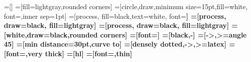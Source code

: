\usepackage{ifthen}
\usepackage{tikz}
\usetikzlibrary{arrows,shapes}


=[]
=[fill=lightgray,rounded corners]
=[circle,draw,minimum size=15pt,fill=white,
font=\footnotesize,inner sep=1pt]
=[process, fill=black,text=white, font=\bfseries]
=[process, draw=black, fill=lightgray]
=[process, draw=black, fill=lightgray]
=[white,draw=black,rounded corners]
=[font=\footnotesize]
=[black,-]%
=[->,>=angle 45]
=[min distance=30pt,curve to]
=[densely dotted,->,>=latex]
=[font=\bfseries,very thick]
=[hl]
=[font=\normalfont,thin]

\newcommand{\currentScope}{}
\newcommand{\currentSort}{}
\newcommand{\currentSortLabel}{}
\newcommand{\currentAlign}{}
\newcommand{\currentSize}{}

\newcommand{\TSetSortLabel}[2]{
  \expandafter\repcommand\expandafter{\csname TUserSort@#1\endcsname}{#2}
}
\newcommand{\TSort}[4]{
  \renewcommand{\currentScope}{#1}
  \renewcommand{\currentSort}{#2}
  \renewcommand{\currentSize}{#3}
  \renewcommand{\currentAlign}{#4}
  \ifcsname TUserSort@\currentSort\endcsname
    \renewcommand{\currentSortLabel}{\csname TUserSort@\currentSort\endcsname}
  \else
    \renewcommand{\currentSortLabel}{\currentSort}
  \fi
  \begin{scope}[shift={\currentScope}]
  \ifthenelse{\equal{\currentAlign}{l}}{
    \filldraw[process box] (-0.5,-0.5) rectangle (0.5,\currentSize-0.5);
    \node[sort] at (-0.2,\currentSize-0.4) {\currentSortLabel};
   }{\ifthenelse{\equal{\currentAlign}{r}}{
     \filldraw[process box] (-0.5,-0.5) rectangle (0.5,\currentSize-0.5);
     \node[sort] at (0.2,\currentSize-0.4) {\currentSortLabel};
   }{
    \filldraw[process box] (-0.5,-0.5) rectangle (\currentSize-0.5,0.5);
    \ifthenelse{\equal{\currentAlign}{t}}{
      \node[sort,anchor=east] at (-0.3,0.2) {\currentSortLabel};
    }{
      \node[sort] at (-0.6,-0.2) {\currentSortLabel};
    }
   }}
  \setcounter{la}{\currentSize}
  \addtocounter{la}{-1}
  \foreach \i in {0,...,\value{la}} {
    \TProc{\i}
  }
  \end{scope}
}

